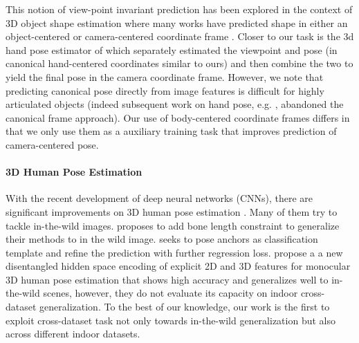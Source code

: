 \documentclass[runningheads]{llncs}
\begin{document}
This notion of view-point invariant prediction has been explored in the context
of 3D object shape estimation
\cite{choy20163d,groueix2018,mescheder2019occupancy,richter2018matryoshka,shin2018pixels,tatarchenko2017octree,drcTulsiani17,yan2016perspective}
where many works have predicted shape in either an object-centered  or camera-centered
coordinate frame \cite{shin2018pixels,tatarchenko2019single,zhang2018learning}. Closer to our task is the 3d hand pose
estimator of \cite{zb2017hand} which separately estimated the viewpoint and
pose (in canonical hand-centered coordinates similar to ours) and then combine
the two to yield the final pose in the camera coordinate frame. However, we
note that predicting canonical pose directly from image features is difficult
for highly articulated objects (indeed subsequent work on hand pose, e.g.
\cite{eccv2018handpose}, abandoned the canonical frame approach).  Our use of
body-centered coordinate frames differs in that we only use them as a
auxiliary training task that improves prediction of camera-centered pose. 




\paragraph{3D Human Pose Estimation} With the recent development of deep neural networks (CNNs),
there are  significant  improvements  on  3D  human  pose  estimation \cite{inthewildintermediate,simple,volumetric,xiao2018simple}. Many of them try to tackle in-the-wild images. \cite{Zhou_2017_ICCV} proposes to add bone length constraint to generalize their methods to in the wild image.  \cite{LCRnet++} seeks to pose anchors as classification template and refine the prediction with further regression loss. \cite{inthewildintermediate}  propose a a new disentangled hidden space
encoding of explicit 2D and 3D features for monocular 3D human pose estimation
that shows high accuracy and generalizes well to in-the-wild scenes, however,
they do not evaluate its capacity on indoor cross-dataset generalization. To
the best of our knowledge, our work is the first to exploit cross-dataset task
not only towards in-the-wild generalization but also across different indoor
datasets.
\end{document}
